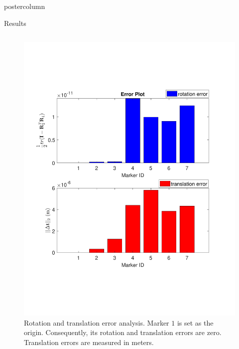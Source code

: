 \documentclass{beamer}
\begin{document}
\begin{frame}
\begin{columns}
\begin{column}{.57\textwidth}
\begin{beamercolorbox}[center]{postercolumn}
\begin{minipage}{.98\textwidth}
{\begin{myblock}{Results}
\begin{minipage}[0.3\textheight]{\textwidth}
\begin{columns}[T]
\begin{column}{0.33\textwidth}
\begin{enumerate}[label=,labelindent=\parindent,leftmargin=*]
\begin{figure}
\includegraphics[width=1.0\textwidth]{img/synthetic_rt_new}
\caption{Rotation and translation error analysis. Marker $1$ is set as the origin. Consequently, its rotation and translation errors are zero. Translation errors are measured in meters.}
\label{fig:synthetic_rt}
\end{figure}
\end{enumerate}
\end{column}


\end{columns}
\end{minipage}
\end{myblock}}
\end{minipage}
\end{beamercolorbox}
\end{column}
\end{columns}
\end{frame}
\end{document}

